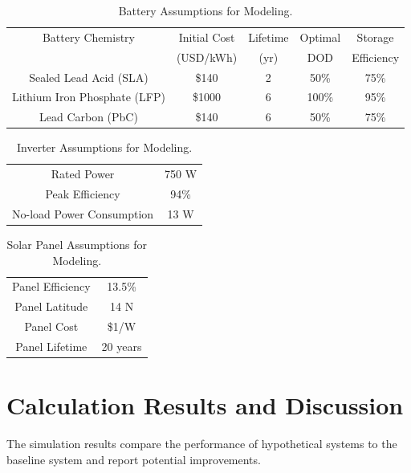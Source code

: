 \documentclass[conference]{IEEEtran}
\begin{document}
\begin{table}
\centering
\begin{tabular}{ c c c c c }
Battery Chemistry            & Initial Cost & Lifetime & Optimal & Storage    \\
                             & (USD/kWh)    & (yr)     & DOD     & Efficiency \\
Sealed Lead Acid (SLA)       & \$140        & 2        &  50\%   & 75\%       \\
Lithium Iron Phosphate (LFP) & \$1000       & 6        & 100\%   & 95\%       \\
Lead Carbon (PbC)            & \$140        & 6        &  50\%   & 75\%       \\
\end{tabular}
\caption{Battery Assumptions for Modeling.}
\label{table_battery_assumptions}
\end{table}

\begin{table}
\centering
\begin{tabular}{ c c }
Rated Power               & 750 W \\
Peak Efficiency           & 94\%  \\
No-load Power Consumption & 13 W  \\
\end{tabular}
\caption{Inverter Assumptions for Modeling.}
\label{tbl_inverter_assumptions}
\end{table}


\begin{table}
\centering
\begin{tabular}{ c c }
Panel Efficiency & 13.5\%   \\
Panel Latitude   & 14 N     \\
Panel Cost       & \$1/W    \\
Panel Lifetime   & 20 years \\
\end{tabular}
\caption{Solar Panel Assumptions for Modeling.}
\label{table_panel_assumptions}
\end{table}


\section{Calculation Results and Discussion}

The simulation results compare the performance of hypothetical
systems to the baseline system and report potential improvements.
\end{document}
